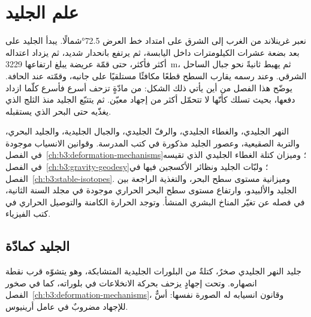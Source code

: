 \chapter{علم الجليد}\label{ch:b3:glaciology}

نعبر غرينلاند من الغرب إلى الشرق على امتداد خط العرض \ang{72.5}شمالًا. يبدأ الجليد
على بعد بضعة عشرات الكيلومترات داخل اليابسة، ثم يرتفع بانحدار شديد، ثم يزداد اعتداله أكثر فأكثر،
حتى قمّة عريضة يبلغ ارتفاعها \qty{3229}{m}، ثم يهبط ثانيةً نحو جبال
الساحل الشرقي. وعند رسمه يقارب السطح قطعًا مكافئًا مستلقيًا على جانبه،
وقمّته عند الحافة. يوضّح هذا الفصل من أين يأتي ذلك الشكل:
من مادّةٍ تزحف أسرع فأسرع كلّما ازداد دفعها،
بحيث تسلك كأنّها لا تتحمّل أكثر من إجهاد معيّن.
ثم يتتبّع الجليد منذ الثلج الذي يغذّيه
حتى البحر الذي يستقبله.

\begin{recall}
النهر الجليدي، والغطاء الجليدي، والرفّ الجليدي، والجبال الجليدية، والجليد البحري، والتربة الصقيعية، وعصور
الجليد مذكورة في كتب المدرسة. وقوانين الانسياب  موجودة في
الفصل~\ref{ch:b3:deformation-mechanisms}؛ 
وميزان كتلة الغطاء الجليدي الذي تقيسه في الفصل~\ref{ch:b3:gravity-geodesy}؛
ولبّات الجليد ونظائر الأكسجين فيها في الفصل~\ref{ch:b3:stable-isotopes}.
وميزانية مستوى سطح البحر، والتغذية الراجعة بين الجليد والألبيدو، وارتفاع
مستوى سطح البحر الحراري موجودة في مجلد السنة الثانية، في فصله عن تغيّر المناخ
البشري المنشأ. وتوجد الحرارة الكامنة والتوصيل الحراري في كتب الفيزياء.
\end{recall}

\section{الجليد كمادّة}\label{sec:b3:glaciology:material}

جليد النهر الجليدي صخرٌ، كتلةٌ من البلورات الجليدية المتشابكة، وهو
يتشوّه قرب نقطة انصهاره. وتحت إجهادٍ يزحف بحركة الانخلاعات
في بلوراته، كما في صخور
الفصل~\ref{ch:b3:deformation-mechanisms}، وقانون انسيابه له الصورة نفسها:
أسٌّ للإجهاد مضروبٌ في عامل أرينيوس.

